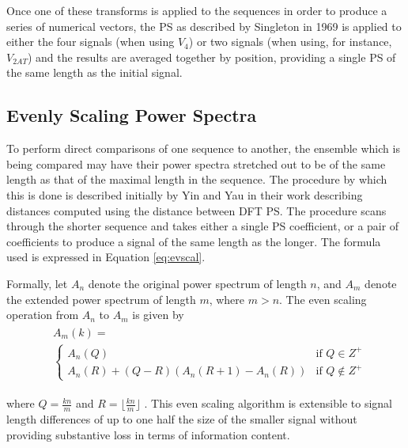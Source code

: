 \documentclass[12pt,conference]{IEEEtran}
\begin{document}
Once one of these transforms is applied to the sequences in order to produce a series of numerical vectors, 
the PS as described by Singleton in 1969 \cite{Sin69} is applied to either the 
four signals (when using $V_4$)  or two signals (when using, for instance, $V_{2AT}$) and the results 
are averaged together by position, providing a single PS of the same length as the initial signal. 

\vspace{-0.5 em}
\subsection{Evenly Scaling Power Spectra} 
To perform direct comparisons of one sequence to another, the ensemble which is being compared
may have their power spectra stretched out to be of the same length as that of the maximal length in 
the sequence.  The procedure by which this is done is described initially by Yin and Yau \cite{yin15} in 
their work describing distances computed using the distance between DFT PS.  The procedure 
scans through the shorter sequence and takes either a single PS coefficient, or a pair of coefficients to 
produce a signal of the same length as the longer.  The formula used is expressed in Equation \ref{eq:evscal}. 


Formally, let $A_n$ denote the original power spectrum of length $n$, and $A_m$ denote the extended power spectrum of length $m$, where $m > n$. The even scaling operation from $A_n$ to $A_m$ is given by
\vspace{-0.5 em}
{\small
\begin{align}
\begin{split}
&A_m(k)=\\
&\begin{cases} A_n(Q) & \mbox{if } Q\in Z^+\\
 A_n(R) + (Q-R)(A_n(R+1)-A_n(R)) & \mbox{if } Q  \notin Z^+
\end{cases}
\label{eq:evscal}
\end{split}
\end{align}
}

\vspace{-0.5 em}
\noindent where $Q = \frac{kn}{m}$ and $R = \lfloor \frac{kn}{m} \rfloor$ \cite{yin15}. This even scaling algorithm is extensible to signal length differences of up to one half the size of the smaller signal without providing substantive loss in terms of information content.
\end{document}
